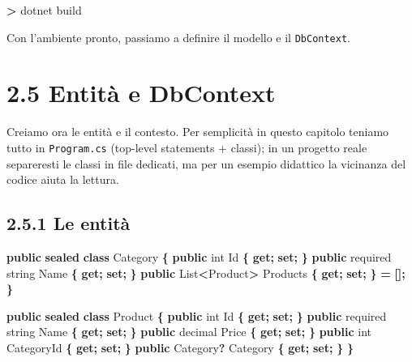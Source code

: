 \documentclass[
  italian,
  10pt,
]{book}
\newenvironment{Shaded}{\begin{snugshade}}{\end{snugshade}}
\newcommand{\DataTypeTok}[1]{\textcolor[rgb]{0.13,0.29,0.53}{#1}}
\newcommand{\ExtensionTok}[1]{#1}
\newcommand{\KeywordTok}[1]{\textcolor[rgb]{0.13,0.29,0.53}{\textbf{#1}}}
\newcommand{\NormalTok}[1]{#1}
\newcommand{\OperatorTok}[1]{\textcolor[rgb]{0.81,0.36,0.00}{\textbf{#1}}}
\begin{document}
\begin{Shaded}
\begin{Highlighting}[]
\OperatorTok{\textgreater{}}\NormalTok{ dotnet }\ExtensionTok{build}
\end{Highlighting}
\end{Shaded}

Con l'ambiente pronto, passiamo a definire il modello e il
\texttt{DbContext}.

\section{2.5 Entità e DbContext}\label{entituxe0-e-dbcontext}

Creiamo ora le entità e il contesto. Per semplicità in questo capitolo
teniamo tutto in \texttt{Program.cs} (top-level statements + classi); in
un progetto reale separeresti le classi in file dedicati, ma per un
esempio didattico la vicinanza del codice aiuta la lettura.

\subsection{2.5.1 Le entità}\label{le-entituxe0-1}

\begin{Shaded}
\begin{Highlighting}[]
\KeywordTok{public} \KeywordTok{sealed} \KeywordTok{class}\NormalTok{ Category}
\OperatorTok{\{}
    \KeywordTok{public} \DataTypeTok{int}\NormalTok{ Id }\OperatorTok{\{} \KeywordTok{get}\OperatorTok{;} \KeywordTok{set}\OperatorTok{;} \OperatorTok{\}}
    \KeywordTok{public}\NormalTok{ required }\DataTypeTok{string}\NormalTok{ Name }\OperatorTok{\{} \KeywordTok{get}\OperatorTok{;} \KeywordTok{set}\OperatorTok{;} \OperatorTok{\}}
    \KeywordTok{public}\NormalTok{ List}\OperatorTok{\textless{}}\NormalTok{Product}\OperatorTok{\textgreater{}}\NormalTok{ Products }\OperatorTok{\{} \KeywordTok{get}\OperatorTok{;} \KeywordTok{set}\OperatorTok{;} \OperatorTok{\}} \OperatorTok{=} \OperatorTok{[];}
\OperatorTok{\}}

\KeywordTok{public} \KeywordTok{sealed} \KeywordTok{class}\NormalTok{ Product}
\OperatorTok{\{}
    \KeywordTok{public} \DataTypeTok{int}\NormalTok{ Id }\OperatorTok{\{} \KeywordTok{get}\OperatorTok{;} \KeywordTok{set}\OperatorTok{;} \OperatorTok{\}}
    \KeywordTok{public}\NormalTok{ required }\DataTypeTok{string}\NormalTok{ Name }\OperatorTok{\{} \KeywordTok{get}\OperatorTok{;} \KeywordTok{set}\OperatorTok{;} \OperatorTok{\}}
    \KeywordTok{public} \DataTypeTok{decimal}\NormalTok{ Price }\OperatorTok{\{} \KeywordTok{get}\OperatorTok{;} \KeywordTok{set}\OperatorTok{;} \OperatorTok{\}}
    \KeywordTok{public} \DataTypeTok{int}\NormalTok{ CategoryId }\OperatorTok{\{} \KeywordTok{get}\OperatorTok{;} \KeywordTok{set}\OperatorTok{;} \OperatorTok{\}}
    \KeywordTok{public}\NormalTok{ Category}\OperatorTok{?}\NormalTok{ Category }\OperatorTok{\{} \KeywordTok{get}\OperatorTok{;} \KeywordTok{set}\OperatorTok{;} \OperatorTok{\}}
\OperatorTok{\}}
\end{Highlighting}
\end{Shaded}
\end{document}
